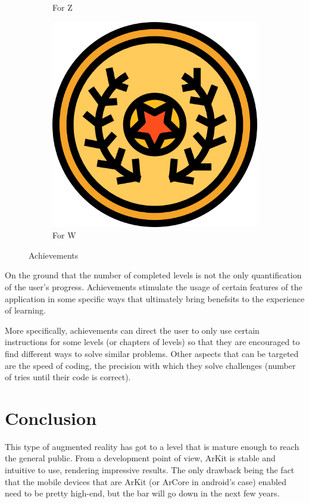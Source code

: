 \documentclass[12 pct]{report}
\begin{document}
\begin{figure}[H]
\begin{subfigure}[b]{0.3\linewidth}
    \caption{For Z}
  \end{subfigure}
  \begin{subfigure}[b]{0.3\linewidth}
    \includegraphics[width=\linewidth]{ArRobotCodeAchiv4}
    \caption{For W}
  \end{subfigure}
  \caption{Achievements}
  \label{fig:coffee3}
\end{figure}

On the ground that the number of completed levels is not the only quantification of the user's progress. Achievements stimulate the usage of certain features of the application in some specific ways that ultimately bring benefsits to the experience of learning.

More specifically, achievements can direct the user to only use certain instructions for some levels (or chapters of levels) so that they are encouraged to find different ways to solve similar problems. Other aspects that can be targeted are the speed of coding, the precision with which they solve challenges (number of tries until their code is correct).

\section{Conclusion}
This type of augmented reality has got to a level that is mature enough to reach the general public. From a development point of view, ArKit is stable and intuitive to use, rendering impressive results. The only drawback being the fact that the mobile devices that are ArKit (or ArCore in android's case) enabled need to be pretty high-end, but the bar will go down in the next few years. 
\end{document}
